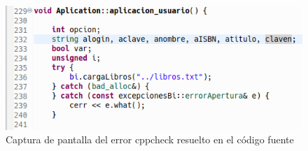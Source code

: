 		\begin{figure}[H]
			\centering
			\includegraphics[scale=0.55]{img/captura84.png}
			\caption{Captura de pantalla del error cppcheck resuelto en el código fuente}
			\label{captura84}
		\end{figure}
\newpage